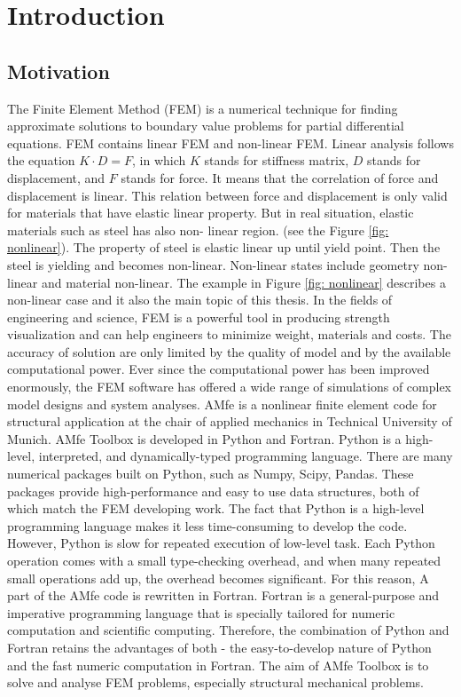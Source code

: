 \chapter{Introduction}



\section{Motivation} \label{sec:Einl:Motivation}
The Finite Element Method (FEM) is a numerical technique for finding approximate solutions to boundary value problems for partial differential equations. FEM contains linear FEM and non-linear FEM. 
Linear analysis follows the equation $K\cdot D = F$, in which $K$ stands for stiffness matrix, $D$ stands for  displacement, and $F$ stands for force. It means that the correlation of force and displacement is linear. This relation between force and displacement is only valid for materials that have elastic linear property. But in real situation, elastic materials such as steel has also non- linear region. (see the Figure \ref{fig: nonlinear}). The property of steel is elastic linear up until yield point. Then the steel is yielding and becomes non-linear. Non-linear states include geometry non-linear and material non-linear. The example in Figure \ref{fig: nonlinear} describes a non-linear case and it also the main topic of this thesis. In the fields of engineering and science, FEM is a powerful tool in producing strength visualization and can help engineers to minimize weight, materials and costs. The accuracy of solution are only limited by the quality of model and by the available computational power.  Ever since the computational power has been improved enormously, the FEM software has offered a wide range of simulations of complex model designs and system analyses.  \newline
AMfe is a nonlinear finite element code for structural application at the chair of applied mechanics in Technical University of Munich. AMfe Toolbox is developed in Python and Fortran. Python is a high-level, interpreted, and dynamically-typed programming language.  There are many numerical packages built on Python, such as Numpy, Scipy, Pandas. These packages provide high-performance and easy to use data structures, both of which match the FEM developing work. The fact that Python is a high-level programming language makes it less time-consuming to develop the code. However, Python is slow for repeated execution of low-level task. Each Python operation comes with a small type-checking overhead, and when many repeated small operations add up, the overhead becomes significant. For this reason, A part of the AMfe code is rewritten in Fortran. Fortran is a general-purpose and imperative programming language that is specially tailored for numeric computation and scientific computing. Therefore, the combination of Python and Fortran retains the advantages of both - the easy-to-develop nature of Python and the fast numeric computation in Fortran. The aim of AMfe Toolbox is to solve and analyse FEM problems, especially structural mechanical problems.
